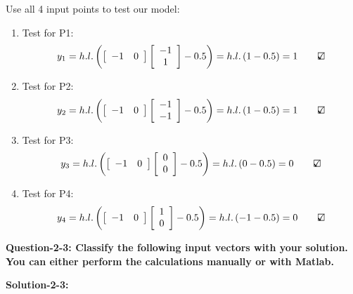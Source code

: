 \documentclass[12pt,letterpaper]{article}
\theoremstyle{definition}
\begin{document}
Use all 4 input points to test our model:
\begin{enumerate}
    \item Test for P1:
    \[{y_1} = h.l.\left( {\left[ {\begin{array}{*{20}{c}}
-1&0
\end{array}} \right]\left[ {\begin{array}{*{20}{c}}
{ - 1}\\
1
\end{array}} \right] -0.5} \right) = h.l.\left( { 1 -0.5} \right) = 1 \qquad \text{\rlap{$\checkmark$}}\square\] 

\item Test for P2:
\[{y_2} = h.l.\left( {\left[ {\begin{array}{*{20}{c}}
-1&0
\end{array}} \right]\left[ {\begin{array}{*{20}{c}}
{ - 1}\\
{ - 1}
\end{array}} \right] -0.5} \right) = h.l.\left( {  1 -0.5} \right) = 1\qquad \text{\rlap{$\checkmark$}}\square\] 


\item Test for P3:
\[{y_3} = h.l.\left( {\left[ {\begin{array}{*{20}{c}}
{ - 1}&0
\end{array}} \right]\left[ {\begin{array}{*{20}{c}}
0\\
0
\end{array}} \right]  - 0.5} \right) = h.l.\left( { 0 - 0.5} \right) = 0\qquad {\rlap{$\checkmark$}}\square\]

\item Test for P4:
\[{y_4} = h.l.\left( {\left[ {\begin{array}{*{20}{c}}
-1&0
\end{array}} \right]\left[ {\begin{array}{*{20}{c}}
1\\
0
\end{array}} \right] - 0.5} \right) = h.l.\left( { -1 - 0.5} \right) = 0\qquad {\rlap{$\checkmark$}}\square\]
\end{enumerate}

\textbf{Question-2-3: Classify the following input vectors with your solution. You can either perform
the calculations manually or with Matlab.}


\textbf{Solution-2-3:}
\end{document}
